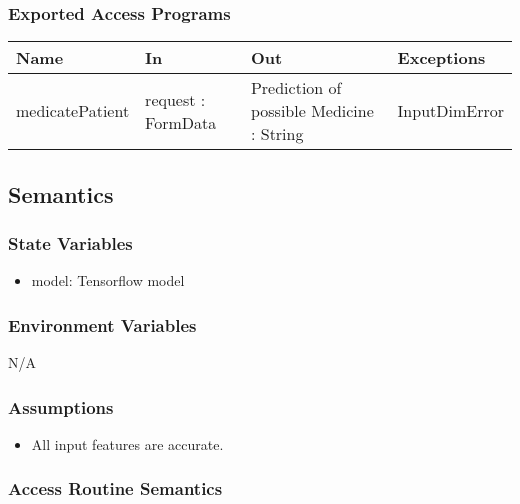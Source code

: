 \documentclass[12pt, titlepage]{article}
\begin{document}
\subsubsection{Exported Access Programs}

\begin{center}
\begin{tabular}{p{2cm} p{4cm} p{4cm} p{2cm}}
\hline
\textbf{Name} & \textbf{In} & \textbf{Out} & \textbf{Exceptions} \\
\hline
medicatePatient & request : FormData & Prediction of possible Medicine : String & InputDimError \\
\hline
\end{tabular}
\end{center}

\subsection{Semantics}

\subsubsection{State Variables}

\begin{itemize}
  \item model: Tensorflow model
\end{itemize}

\subsubsection{Environment Variables}

N/A

\subsubsection{Assumptions}


\begin{itemize}
  \item All input features are accurate.
\end{itemize}

\subsubsection{Access Routine Semantics}
\end{document}
